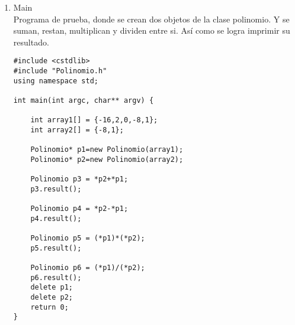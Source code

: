 \documentclass[11pt]{article}
\begin{document}
\begin{enumerate}
\begin{itemize}
Al confirmar dichas restricciones, se inicia con el algoritmo. Se crea un arreglo temporal con tama\~no de la resta entre el grado del dividendo y el grado del divisor. Y se toma el coeficiente en la posicion m\'as alta del dividendo, como una variable temporal y esta se guarda en la posici\'on m\'as alta del arreglo temporal. Se inicia un ciclo, que inicia en el grado del dividendo -1 y este va decreciendo hasta alcanzar el valor de 0.Luego la variable temporal se multiplica por el valor en la posici\'on m\'as peque\~na del divisor, y se guarda en temp2. Y se realiza la suma entre el elemento en data en la posicion [i] y el valor temp2, esto se guarda en la posicion en el arreglo de i-1 y en la variable temporal.\\
Se retorna un objeto Polinomio que recibe como par\'ametro el arreglo temporal.
\begin{lstlisting}
 Polinomio& Polinomio::operator/(const Polinomio &other){
     Polinomio* result = NULL;
     if(other.grado!=1||grado<1||other.data[1]!=1)
     {
         cout<<"No se puede realizar dicha division por el metodo de division sintetica."<<endl;
         result = new Polinomio(NULL,0);
     }
     else{
         int* tempArray = new int[grado-other.grado+1];
         int temp = data[grado];
         int div = other.data[0]*(-1);
         tempArray[grado-other.grado]=temp;
         for(int i=grado-1;i>0;i--){
             int temp2= temp*div;
             tempArray[i-1]=data[i]+temp2;
             temp=tempArray[i-1];
             
         }
         result = new Polinomio(tempArray,grado-other.grado+1);
         delete[] tempArray;
     }
     return *result;
 }
\end{lstlisting}
\end{itemize}

\item Main
\\Programa de prueba, donde se crean dos objetos de la clase polinomio. Y se suman, restan, multiplican y dividen entre si. 
As\'i como se logra imprimir su resultado.

\begin{lstlisting}
#include <cstdlib>
#include "Polinomio.h"
using namespace std;

int main(int argc, char** argv) {

    int array1[] = {-16,2,0,-8,1};
    int array2[] = {-8,1};
    
    Polinomio* p1=new Polinomio(array1);
    Polinomio* p2=new Polinomio(array2);
    
    Polinomio p3 = *p2+*p1;
    p3.result();

    Polinomio p4 = *p2-*p1;
    p4.result();

    Polinomio p5 = (*p1)*(*p2);
    p5.result();
    
    Polinomio p6 = (*p1)/(*p2);
    p6.result();
    delete p1;
    delete p2;
    return 0;
}
\end{lstlisting}
\end{enumerate}
\end{document}
